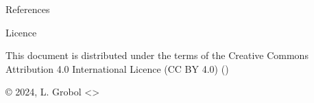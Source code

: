 \documentclass[
	xcolor={svgnames},
	aspectratio=169,
	french,
]{beamer}
\begin{document}
\begin{frame}[allowframebreaks]{References}
	\printbibliography[heading=none]
\end{frame}

\begin{frame}{Licence}
	\begin{english}
		\begin{center}
			{\huge \ccby}
			\vfill
			This document is distributed under the terms of the Creative Commons Attribution 4.0 International Licence (CC BY 4.0) ()

			\vfill
			© 2024, L. Grobol <>

		\end{center}
	\end{english}
\end{frame}
\end{document}
